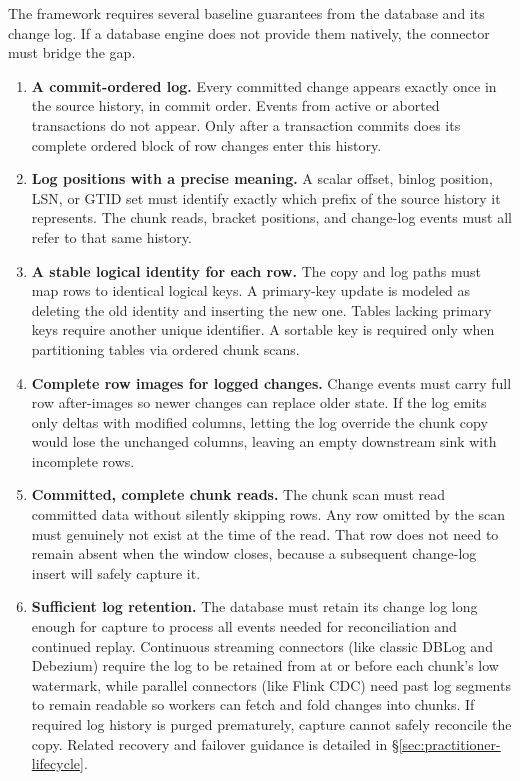 \documentclass[sigconf,nonacm,10pt]{acmart}
\theoremstyle{plain}
\theoremstyle{definition}
\begin{document}
The framework requires several baseline guarantees from the database 
and its change log. If a database engine does not provide them natively,
the connector must bridge the gap.

\begin{enumerate}
\item \textbf{A commit-ordered log.} Every committed change appears exactly 
once in the source history, in commit order. Events from active or aborted
transactions do not appear. Only after a transaction commits does its
complete ordered block of row changes enter this history.

\item \textbf{Log positions with a precise meaning.} A scalar offset,
binlog position, LSN, or GTID set must identify exactly which prefix of
the source history it represents. The chunk reads, bracket
positions, and change-log events must all refer to that same history.

\item \textbf{A stable logical identity for each row.} The copy and log
paths must map rows to identical logical keys. A primary-key update is
modeled as deleting the old identity and inserting the new one. Tables
lacking primary keys require another unique identifier. A sortable 
key is required only when partitioning tables via ordered chunk scans.

\item \textbf{Complete row images for logged changes.} Change events must 
carry full row after-images so newer changes can replace older state. 
If the log emits only deltas with modified columns, letting the log 
override the chunk copy would lose the unchanged columns, leaving an 
empty downstream sink with incomplete rows.

\item \textbf{Committed, complete chunk reads.} The chunk scan must read 
committed data without silently skipping rows. Any row omitted by the scan 
must genuinely not exist at the time of the read. That row does not need to 
remain absent when the window closes, because a subsequent change-log insert 
will safely capture it.

\item \textbf{Sufficient log retention.} The database must retain its 
change log long enough for capture to process all events needed for reconciliation 
and continued replay. Continuous streaming connectors (like classic DBLog and Debezium) 
require the log to be retained from at or before each chunk's low watermark, while parallel 
connectors (like Flink CDC) need past log segments to remain readable 
so workers can fetch and fold changes into chunks. If required log history is 
purged prematurely, capture cannot safely reconcile the copy. Related recovery and 
failover guidance is detailed in \S\ref{sec:practitioner-lifecycle}.

\end{enumerate}
\end{document}
